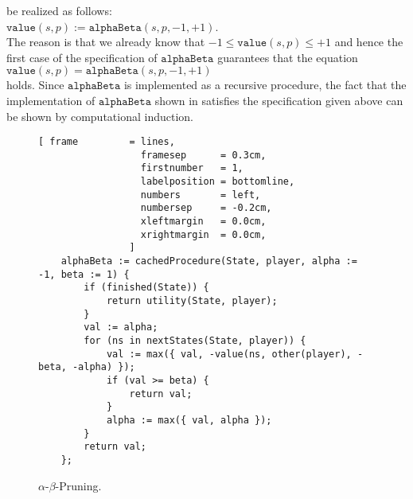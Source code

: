 be realized as follows: 
\\[0.2cm]
\hspace*{1.3cm}
$\texttt{value}(s, p ) := \texttt{alphaBeta}(s, p, -1, +1)$.
\\[0.2cm]
The reason is that we already know that $-1 \leq \texttt{value}(s,p) \leq +1$ and hence the first case of the
specification of $\texttt{alphaBeta}$ guarantees that the equation
\\[0.2cm]
\hspace*{1.3cm}
$\texttt{value}(s,p) = \texttt{alphaBeta}(s,p,-1,+1)$
\\[0.2cm]
holds.  Since $\texttt{alphaBeta}$ is implemented as a recursive procedure, 
the fact that the implementation of $\texttt{alphaBeta}$ shown in  satisfies the
specification given above can be shown by computational induction.  


\begin{figure}[!ht]
\centering
\begin{Verbatim}[ frame         = lines, 
                  framesep      = 0.3cm, 
                  firstnumber   = 1,
                  labelposition = bottomline,
                  numbers       = left,
                  numbersep     = -0.2cm,
                  xleftmargin   = 0.0cm,
                  xrightmargin  = 0.0cm,
                ]
    alphaBeta := cachedProcedure(State, player, alpha := -1, beta := 1) {
        if (finished(State)) {
            return utility(State, player);
        }
        val := alpha;
        for (ns in nextStates(State, player)) {
            val := max({ val, -value(ns, other(player), -beta, -alpha) });
            if (val >= beta) {
                return val;
            }
            alpha := max({ val, alpha });
        }
        return val;
    };
\end{Verbatim}
\vspace*{-0.3cm}
\caption{$\alpha$-$\beta$-Pruning.}
\label{fig:game-alpha-beta.stlx}
\end{figure}

